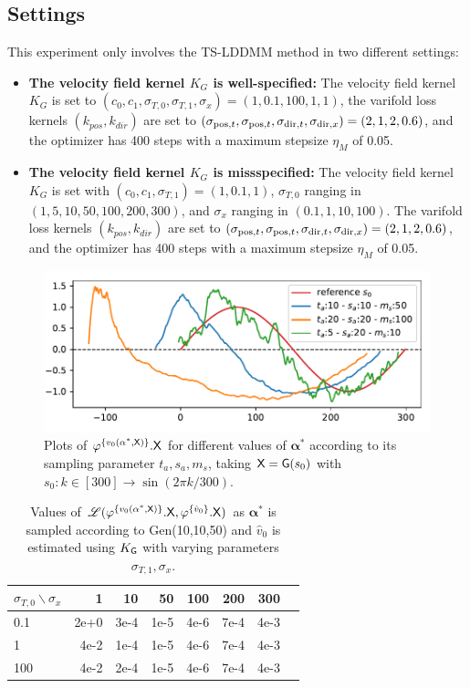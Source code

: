 \subsection{Settings}
\label{appendix: settings_identifiability}
This experiment only involves the TS-LDDMM method in two different settings: 
\begin{itemize}
  \item \textbf{The velocity field kernel $K_G$ is well-specified:} The velocity field kernel $K_G$ is set to $ (c_0,c_1,\sigma_{T,0},\sigma_{T,1},\sigma_x) = (1,0.1,100,1,1)$, the varifold loss kernels $(k_{pos},k_{dir})$ are set to $(\sigma_{\mathrm{pos},t}, \sigma_{\mathrm{pos},t}, \sigma_{\mathrm{dir},t}, \sigma_{\mathrm{dir},x}) = (2,1,2,0.6)$, and the optimizer has 400 steps with a maximum stepsize $\eta_M$ of 0.05.
  \item \textbf{The velocity field kernel $K_G$ is missspecified:} The velocity field kernel $K_G$ is set with  $(c_0,c_1,\sigma_{T,1}) = (1,0.1,1)$, $\sigma_{T,0}$ ranging in $(1,5,10,50,100,200,300)$, and $\sigma_x$  ranging in $(0.1,1,10,100)$. The varifold loss kernels $(k_{pos},k_{dir})$ are set to $(\sigma_{\mathrm{pos},t}, \sigma_{\mathrm{pos},t}, \sigma_{\mathrm{dir},t}, \sigma_{\mathrm{dir},x}) = (2,1,2,0.6)$, and the optimizer has 400 steps with a maximum stepsize $\eta_M$ of 0.05.
\end{itemize}

\begin{figure}[t]
  \centering
  \includegraphics[width=0.5\linewidth]{pictures/samples.pdf}
  \caption{Plots of $\varphi^{\{v_0(\mathbf{\alpha}^*,\mathsf{X})\}}.\mathsf{X}$ for different values of $\mathbf{\alpha}^*$ according to its sampling parameter $t_a,s_a,m_s $, taking $\mathsf{X}=\mathsf{G}(s_0)$ with $s_0:k\in [300]\to \sin(2\pi k/300) $.}
  \label{fig:exemple_synthetic}
\end{figure}

\begin{table}
  \caption{Values of $\mathscr{L}(\varphi^{\{v_0(\mathbf{\alpha}^*,\mathsf{X})\}}.\mathsf{X},\varphi^{\{\hat{v}_0\}}.\mathsf{X})$ as $\mathbf{\alpha}^*$ is sampled according to Gen(10,10,50) and $\hat{v}_0$ is estimated using $K_{\mathsf{G}}$ with varying parameters $\sigma_{T,1},\sigma_x$.}
    \centering
       \begin{tabular}{lrrrrrrr}
       \toprule
       $\sigma_{T,0} \backslash \sigma_x$  & 1 & 10 & 50 & 100 & 200 & 300 \\
       \midrule
       0.1 & 2e+0 & 3e-4  & 1e-5&4e-6&7e-4&4e-3 \\
      1 & 4e-2 & 1e-4  & 1e-5&4e-6&7e-4 &4e-3  \\
       100 & 4e-2 & 2e-4  & 1e-5&4e-6&7e-4&4e-3  \\
       \bottomrule
       \end{tabular}
    \label{table:synthetic2}
\end{table}

